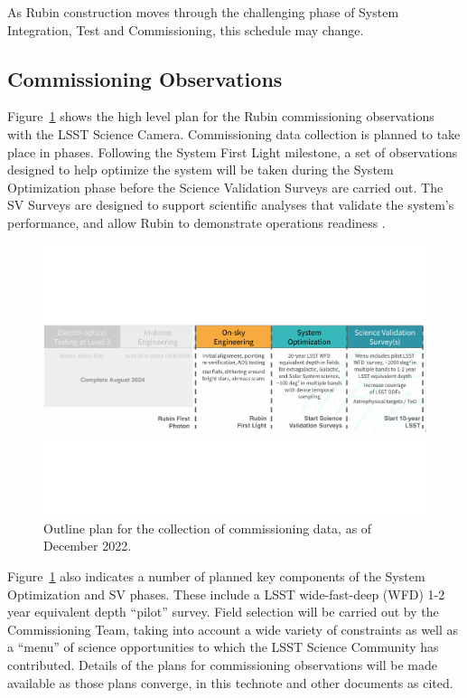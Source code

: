 As Rubin construction moves through the challenging phase of System Integration, Test and Commissioning, this schedule may change.

\subsection{Commissioning Observations}
\label{ssec:commissioning-observations}

Figure~\ref{fig:commissioning} shows the high level plan for the Rubin commissioning observations with the LSST Science Camera.
Commissioning data collection is planned to take place in phases.
Following the System First Light milestone, a set of observations designed to help optimize the system will be taken during the System Optimization phase before the Science Validation Surveys are carried out. 
The SV Surveys are designed to support scientific analyses that validate the system's performance, and allow Rubin to demonstrate operations readiness .

\begin{figure}[htb]
\centering
\includegraphics[width=0.95\linewidth]{figures/commissioning-plan}
\caption{Outline plan for the collection of commissioning data, as of December 2022.}
\label{fig:commissioning}
\end{figure}

Figure~\ref{fig:commissioning} also indicates a number of planned key components of the System Optimization and SV phases.
These include a LSST wide-fast-deep (WFD) 1-2 year equivalent depth ``pilot'' survey.
Field selection will be carried out by the Commissioning Team, taking into account a wide variety of constraints as well as a ``menu'' of science opportunities to which the LSST Science Community has contributed.
Details of the plans for commissioning observations will be made available as those plans converge, in this technote and other documents as cited.